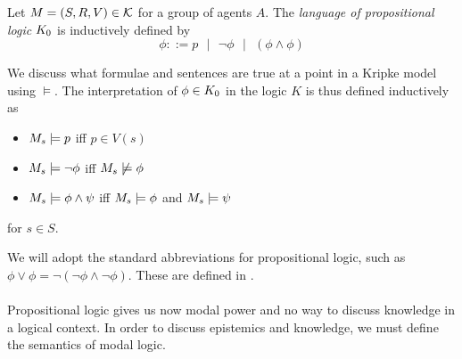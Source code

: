 \begin{defn} \label{propLogic}
Let $M = (S, R, V) \in \mathcal{K}$ for a group of agents $A$.
The {\em language of propositional logic} $K_0$ is inductively defined by
\[
	\phi ::= p \text{ } | \text{ } \neg \phi \text{ } | \text{ } (\phi \land \phi)
\]

We discuss what formulae and sentences are true at a point in a Kripke model using $\models$.
The interpretation of $\phi \in K_0$ in the logic $K$ is thus defined inductively as

\begin{itemize}
	\item $M_s \models p$ iff $p \in V(s)$
	\item $M_s \models \neg \phi$ iff $M_s \not \models \phi$
	\item $M_s \models \phi \land \psi$ iff $M_s \models \phi$ and $M_s \models \psi$
\end{itemize}

for $s \in S$.
\end{defn}

We will adopt the standard abbreviations for propositional logic, such as $\phi \lor \phi =
\neg(\neg \phi \land \neg \phi)$.
These are defined in \cite{blackburn2002modal}.\\
\\
Propositional logic gives us now modal power and no way to discuss knowledge in a logical context.
In order to discuss epistemics and knowledge, we must define the semantics of modal logic.

